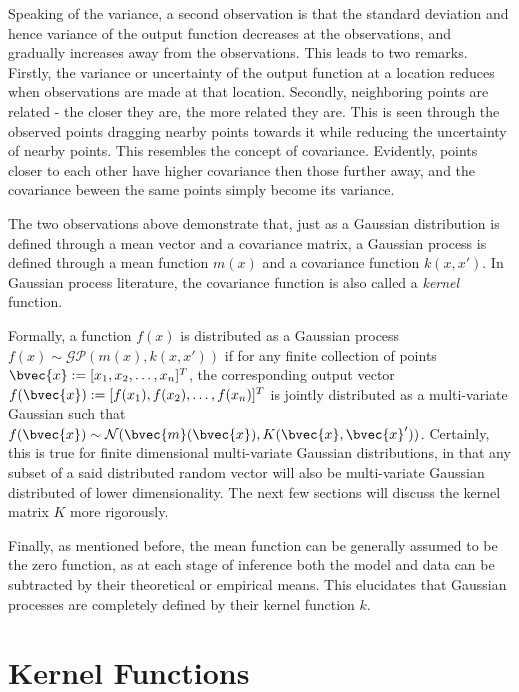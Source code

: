 		Speaking of the variance, a second observation is that the standard deviation and hence variance of the output function decreases at the observations, and gradually increases away from the observations. This leads to two remarks. Firstly, the variance or uncertainty of the output function at a location reduces when observations are made at that location. Secondly, neighboring points are related - the closer they are, the more related they are. This is seen through the observed points dragging nearby points towards it while reducing the uncertainty of nearby points. This resembles the concept of covariance. Evidently, points closer to each other have higher covariance then those further away, and the covariance beween the same points simply become its variance.
		
		The two observations above demonstrate that, just as a Gaussian distribution is defined through a mean vector and a covariance matrix, a Gaussian process is defined through a mean function $m(x)$ and a covariance function $k(x, x')$. In Gaussian process literature, the covariance function is also called a \textit{kernel} function.
		
		Formally, a function $f(x)$ is distributed as a Gaussian process $f(x) \sim \mathcal{GP}(m(x), k(x, x'))$ if for any finite collection of points $\bvec{x} := [x_{1}, x_{2}, \dots, x_{n}]^{T}$, the corresponding output vector $f(\bvec{x}) := [f(x_{1}), f(x_{2}), \dots, f(x_{n})]^{T}$ is jointly distributed as a multi-variate Gaussian such that $f(\bvec{x}) \sim \mathcal{N}(\bvec{m}(\bvec{x}), K(\bvec{x}, \bvec{x}'))$. Certainly, this is true for finite dimensional multi-variate Gaussian distributions, in that any subset of a said distributed random vector will also be multi-variate Gaussian distributed of lower dimensionality. The next few sections will discuss the kernel matrix $K$ more rigorously.
		
		Finally, as mentioned before, the mean function can be generally assumed to be the zero function, as at each stage of inference both the model and data can be subtracted by their theoretical or empirical means. This elucidates that Gaussian processes are completely defined by their kernel function $k$. 
		
		\FloatBarrier
		
	\section{Kernel Functions}
	\label{Background:GaussianProcesses:KernelFunctions}
	
